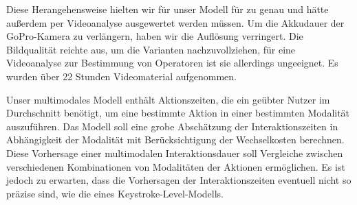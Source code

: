 Diese Herangehensweise hielten wir für unser Modell für zu genau und hätte außerdem per Videoanalyse ausgewertet werden müssen.
Um die Akkudauer der GoPro-Kamera zu verlängern, haben wir die Auflösung verringert.
Die Bildqualität reichte aus, um die Varianten nachzuvollziehen, für eine Videoanalyse zur Bestimmung von Operatoren ist sie allerdings ungeeignet.
Es wurden über 22 Stunden Videomaterial aufgenommen.

Unser multimodales Modell enthält Aktionszeiten, die ein geübter Nutzer im Durchschnitt benötigt, um eine bestimmte Aktion in einer bestimmten Modalität auszuführen.
Das Modell soll eine grobe Abschätzung der Interaktionszeiten in Abhängigkeit der Modalität mit Berücksichtigung der Wechselkosten berechnen.
Diese Vorhersage einer multimodalen Interaktionsdauer soll Vergleiche zwischen verschiedenen Kombinationen von Modalitäten der Aktionen ermöglichen.
Es ist jedoch zu erwarten, dass die Vorhersagen der Interaktionszeiten eventuell nicht so präzise sind, wie die eines Keystroke-Level-Modells.